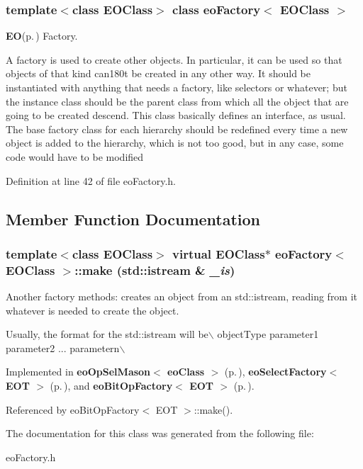 \subsubsection*{template$<$class EOClass$>$ class eo\-Factory$<$ EOClass $>$}

{\bf EO}{\rm (p.\,\pageref{class_e_o})} Factory. 

A factory is used to create other objects. In particular, it can be used so that objects of that kind can180t be created in any other way. It should be instantiated with anything that needs a factory, like selectors or whatever; but the instance class should be the parent class from which all the object that are going to be created descend. This class basically defines an interface, as usual. The base factory class for each hierarchy should be redefined every time a new object is added to the hierarchy, which is not too good, but in any case, some code would have to be modified 



Definition at line 42 of file eo\-Factory.h.

\subsection{Member Function Documentation}
\subsubsection{\setlength{\rightskip}{0pt plus 5cm}template$<$class EOClass$>$ virtual EOClass$\ast$ {\bf eo\-Factory}$<$ EOClass $>$::make (std::istream \& {\em \_\-is})\hspace{0.3cm}{\tt  [pure virtual]}}\label{classeo_factory_a0}


Another factory methods: creates an object from an std::istream, reading from it whatever is needed to create the object. 

Usually, the format for the std::istream will be$\backslash$ object\-Type parameter1 parameter2 ... parametern$\backslash$

Implemented in {\bf eo\-Op\-Sel\-Mason$<$ eo\-Class $>$} {\rm (p.\,\pageref{classeo_op_sel_mason_a0})}, {\bf eo\-Select\-Factory$<$ EOT $>$} {\rm (p.\,\pageref{classeo_select_factory_a0})}, and {\bf eo\-Bit\-Op\-Factory$<$ EOT $>$} {\rm (p.\,\pageref{classeo_bit_op_factory_a0})}.

Referenced by eo\-Bit\-Op\-Factory$<$ EOT $>$::make().

The documentation for this class was generated from the following file:\begin{CompactItemize}
\item 
eo\-Factory.h\end{CompactItemize}
